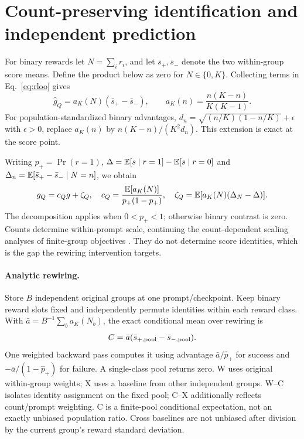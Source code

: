 \section{Count-preserving identification and independent prediction}
For binary rewards let $N=\sum_i r_i$, and let $\bar s_+,\bar s_-$ denote the two
within-group score means. Define the product below as zero for $N\in\{0,K\}$.
Collecting terms in Eq.~\ref{eq:rloo} gives
\begin{equation}
\widehat g_Q=a_K(N)(\bar s_+-\bar s_-),\qquad
a_K(n)=\frac{n(K-n)}{K(K-1)}.\label{eq:count}
\end{equation}
For population-standardized binary advantages,
$d_n=\sqrt{(n/K)(1-n/K)}+\epsilon$ with $\epsilon>0$, replace $a_K(n)$ by
$n(K-n)/(K^2d_n)$. This extension is exact at the score point.

Writing $p_+=\Pr(r=1)$, $\Delta=\mathbb{E}[s\mid r=1]-\mathbb{E}[s\mid r=0]$ and
$\Delta_n=\mathbb{E}[\bar s_+-\bar s_-\mid N=n]$, we obtain
\begin{equation}
g_Q=c_Qg+\zeta_Q,\quad
c_Q=\frac{\mathbb{E}[a_K(N)]}{p_+(1-p_+)},\quad
\zeta_Q=\mathbb{E}[a_K(N)(\Delta_N-\Delta)].\label{eq:identity}
\end{equation}
The decomposition applies when $0<p_+<1$; otherwise binary contrast is zero.
Counts determine within-prompt scale, continuing the count-dependent scaling analyses
of finite-group objectives \citep{rl2ml2026,softmaxgrpo2026}. They do not determine
score identities, which is the gap the rewiring intervention targets.

\paragraph{Analytic rewiring.}
Store $B$ independent original groups at one prompt/checkpoint. Keep binary reward
slots fixed and independently permute identities within each reward class. With
$\bar a=B^{-1}\sum_b a_K(N_b)$, the exact conditional mean over rewiring is
\begin{equation}
C=\bar a(\bar s_{+,\rm pool}-\bar s_{-,\rm pool}).\label{eq:rewire}
\end{equation}
One weighted backward pass computes it using advantage $\bar a/\widehat p_+$ for
success and $-\bar a/(1-\widehat p_+)$ for failure. A single-class pool returns zero.
W uses original within-group weights; X uses a baseline from other independent
groups. W--C isolates identity assignment on the fixed pool; C--X additionally
reflects count/prompt weighting. C is a finite-pool conditional expectation, not
an exactly unbiased population ratio. Cross baselines are not unbiased after
division by the current group's reward standard deviation.

